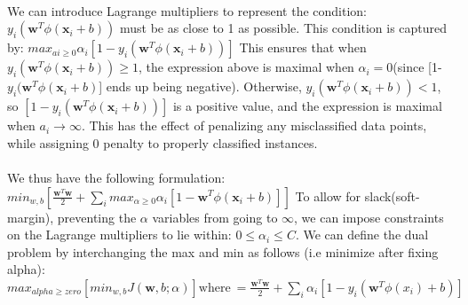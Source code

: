 \documentclass[a4paper]{article}
\begin{document}
\begin{algorithm}
\begin{algorithmic}
\paragraph{}
We can introduce Lagrange multipliers to represent the condition:\newline
$y_{i}(\textbf{w}^T\phi(\textbf{x}_{i} + b ))$ must be as close to 1 as possible.  This condition is captured by: $max_{ai \geq 0}\alpha_{i}[1-y_{i}(\textbf{w}^T\phi(\textbf{x}_{i} + b ))]$ This ensures that when $y_{i}(\textbf{w}^T\phi(\textbf{x}_{i} + b )) \geq 1$, the expression above is maximal when $\alpha_{i} = 0$(since [1- $y_{i}(\textbf{w}^T\phi(\textbf{x}_{i} + b )$] ends up being negative). Otherwise, $y_{i}(\textbf{w}^T\phi(\textbf{x}_{i} + b )) < 1 $, so $[1- y_{i}(\textbf{w}^T\phi(\textbf{x}_{i} + b ))]$ is a positive value, and the expression is maximal when $a_{i} \rightarrow \infty$. This has the effect of penalizing any misclassified data points, while assigning $0$ penalty to properly classified instances.

\paragraph{}
We thus have the following formulation: \newline
$min_{w,b}[\frac{\textbf{w}^T\textbf{w}}{2} + \sum_{i}max_{\alpha \geq 0} \alpha_{i}[1-\textbf{w}^T\phi(\textbf{x}_{i} + b )]]$ \newline
To allow for slack(soft-margin), preventing the $\alpha$ variables from going to $\infty$, we can impose constraints on the Lagrange multipliers to lie within: $0 \leq \alpha_{i} \leq C$.
We can define the dual problem by interchanging the max and min as follows (i.e minimize after fixing alpha): \newline
$max_{alpha \geq zero}[min_{w,b}J(\textbf{w},b;\alpha)] \text{where} \ = \frac{\textbf{w}^T\textbf{w}}{2}+ \sum_{i}\alpha_{i}[1 - y_{i}(\textbf{w}^T\phi(x_{i}) + b)]$



   
 \end{algorithmic}
\end{algorithm}
 
\end{document}
